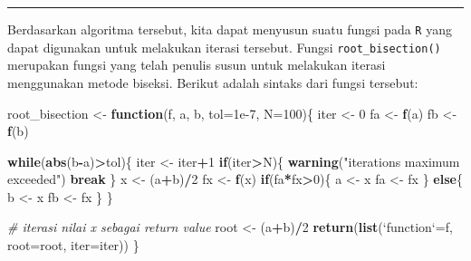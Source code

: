 \documentclass[]{book}
\newenvironment{Shaded}{\begin{snugshade}}{\end{snugshade}}
\newcommand{\CommentTok}[1]{\textcolor[rgb]{0.56,0.35,0.01}{\textit{#1}}}
\newcommand{\ControlFlowTok}[1]{\textcolor[rgb]{0.13,0.29,0.53}{\textbf{#1}}}
\newcommand{\DataTypeTok}[1]{\textcolor[rgb]{0.13,0.29,0.53}{#1}}
\newcommand{\DecValTok}[1]{\textcolor[rgb]{0.00,0.00,0.81}{#1}}
\newcommand{\FloatTok}[1]{\textcolor[rgb]{0.00,0.00,0.81}{#1}}
\newcommand{\KeywordTok}[1]{\textcolor[rgb]{0.13,0.29,0.53}{\textbf{#1}}}
\newcommand{\NormalTok}[1]{#1}
\newcommand{\OperatorTok}[1]{\textcolor[rgb]{0.81,0.36,0.00}{\textbf{#1}}}
\newcommand{\StringTok}[1]{\textcolor[rgb]{0.31,0.60,0.02}{#1}}
\theoremstyle{definition}
\theoremstyle{definition}
\theoremstyle{definition}
\theoremstyle{remark}
\begin{document}
\begin{center}\rule{0.5\linewidth}{\linethickness}\end{center}

Berdasarkan algoritma tersebut, kita dapat menyusun suatu fungsi pada \texttt{R} yang dapat digunakan untuk melakukan iterasi tersebut. Fungsi \texttt{root\_bisection()} merupakan fungsi yang telah penulis susun untuk melakukan iterasi menggunakan metode biseksi. Berikut adalah sintaks dari fungsi tersebut:

\begin{Shaded}
\begin{Highlighting}[]
\NormalTok{root_bisection <-}\StringTok{ }\ControlFlowTok{function}\NormalTok{(f, a, b, }\DataTypeTok{tol=}\FloatTok{1e-7}\NormalTok{, }\DataTypeTok{N=}\DecValTok{100}\NormalTok{)\{}
\NormalTok{  iter <-}\StringTok{ }\DecValTok{0}
\NormalTok{  fa <-}\StringTok{ }\KeywordTok{f}\NormalTok{(a)}
\NormalTok{  fb <-}\StringTok{ }\KeywordTok{f}\NormalTok{(b)}
  
  \ControlFlowTok{while}\NormalTok{(}\KeywordTok{abs}\NormalTok{(b}\OperatorTok{-}\NormalTok{a)}\OperatorTok{>}\NormalTok{tol)\{}
\NormalTok{    iter <-}\StringTok{ }\NormalTok{iter}\OperatorTok{+}\DecValTok{1}
    \ControlFlowTok{if}\NormalTok{(iter}\OperatorTok{>}\NormalTok{N)\{}
      \KeywordTok{warning}\NormalTok{(}\StringTok{"iterations maximum exceeded"}\NormalTok{)}
      \ControlFlowTok{break}
\NormalTok{    \}}
\NormalTok{    x <-}\StringTok{ }\NormalTok{(a}\OperatorTok{+}\NormalTok{b)}\OperatorTok{/}\DecValTok{2}
\NormalTok{    fx <-}\StringTok{ }\KeywordTok{f}\NormalTok{(x)}
    \ControlFlowTok{if}\NormalTok{(fa}\OperatorTok{*}\NormalTok{fx}\OperatorTok{>}\DecValTok{0}\NormalTok{)\{}
\NormalTok{      a <-}\StringTok{ }\NormalTok{x}
\NormalTok{      fa <-}\StringTok{ }\NormalTok{fx}
\NormalTok{    \} }\ControlFlowTok{else}\NormalTok{\{}
\NormalTok{      b <-}\StringTok{ }\NormalTok{x}
\NormalTok{      fb <-}\StringTok{ }\NormalTok{fx}
\NormalTok{    \}}
\NormalTok{  \}}
  
  \CommentTok{# iterasi nilai x sebagai return value}
\NormalTok{  root <-}\StringTok{ }\NormalTok{(a}\OperatorTok{+}\NormalTok{b)}\OperatorTok{/}\DecValTok{2}
  \KeywordTok{return}\NormalTok{(}\KeywordTok{list}\NormalTok{(}\StringTok{`}\DataTypeTok{function}\StringTok{`}\NormalTok{=f, }\DataTypeTok{root=}\NormalTok{root, }\DataTypeTok{iter=}\NormalTok{iter))}
\NormalTok{\}}
\end{Highlighting}
\end{Shaded}
\end{document}
